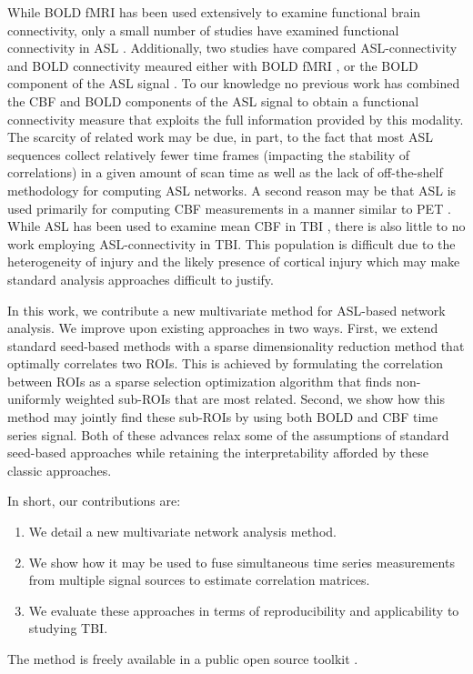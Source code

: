 \documentclass{llncs}
\begin{document}
While BOLD fMRI has been used extensively to examine functional brain connectivity, only a small number of studies have examined functional connectivity in ASL \cite{Chuang2008,Zou2009}. Additionally, two studies have compared ASL-connectivity and BOLD connectivity meaured either with BOLD fMRI \cite{Li2012}, or the BOLD component of the ASL signal \cite{Viviani2011}.  To our knowledge no previous work has combined the CBF and BOLD components of the ASL signal to obtain a functional connectivity measure that exploits the full information provided by this modality. The scarcity of related work may be due, in part, to the fact that most ASL sequences collect relatively fewer time frames (impacting the stability of correlations) in a given amount of scan time as well as the lack of off-the-shelf methodology for computing ASL networks.  A second reason may be that ASL is used primarily for computing CBF measurements in a manner similar to PET \cite{}.  While ASL has been used to examine mean CBF in TBI \cite{Hart2013}, there is also little to no work employing ASL-connectivity in TBI.   This population is difficult due to the heterogeneity of injury and the likely presence of cortical injury which may make standard analysis approaches difficult to justify. 

In this work, we contribute a new multivariate method for ASL-based network analysis.  We improve upon existing approaches in two ways.  First, we extend standard seed-based methods with a sparse dimensionality reduction method that optimally correlates two ROIs.  This is achieved by formulating the correlation between ROIs as a sparse selection optimization algorithm that finds non-uniformly weighted sub-ROIs that are most related.  Second, we show how this method may jointly find these sub-ROIs by using both BOLD and CBF time series signal.  Both of these advances relax some of the assumptions of standard seed-based approaches while retaining the interpretability afforded by these classic approaches.  

In short, our contributions are: 
\begin{enumerate}
\item We detail a new multivariate network analysis method.
\item We show how it may be used to fuse simultaneous time series measurements from multiple signal sources to estimate correlation matrices.
\item We evaluate these approaches in terms of reproducibility and applicability to studying TBI. 
\end{enumerate}
The method is freely available in a public open source toolkit \cite{}.
\end{document}
